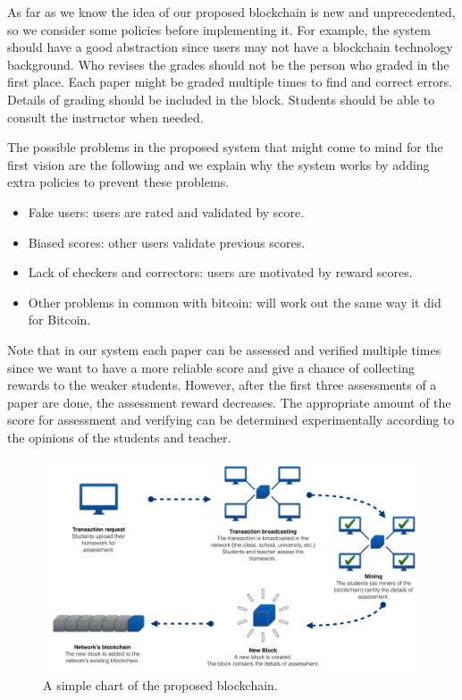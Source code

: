 \documentclass[manuscript,review,anonymous]{acmart}%
\begin{document}
As far as we know the idea of our proposed blockchain is new and unprecedented, so we consider some policies before implementing it. For example, the system should have a good abstraction since users may not have a blockchain technology background. Who revises the grades should not be the person who graded in the first place. Each paper might be graded multiple times to find and correct errors. Details of grading should be included in the block. Students should be able to consult the instructor when needed.


The possible problems in the proposed system that might come to mind for the first vision are the following and we explain why the system works by adding 
extra policies to prevent these problems.
\begin{itemize}
\item Fake users: users are rated and validated by score.
\item Biased scores: other users validate previous scores. 
\item Lack of checkers and correctors: users are motivated by reward scores.
\item Other problems in common with bitcoin: will work out the same way it did for Bitcoin.
\end{itemize}

Note that in our system each paper can be assessed and verified multiple times since we want to have a more reliable score and give a chance of collecting rewards to the weaker students. However, after the first three assessments of a paper are done, the assessment reward decreases.
The appropriate amount of the score for assessment and verifying can be determined experimentally according to the opinions of the students and teacher. 


\begin{figure}[H]
 \caption{A simple chart of the proposed blockchain.}

\includegraphics[scale=0.15]{fig1.pdf}


\label{fig1}
\end{figure}
\end{document}
